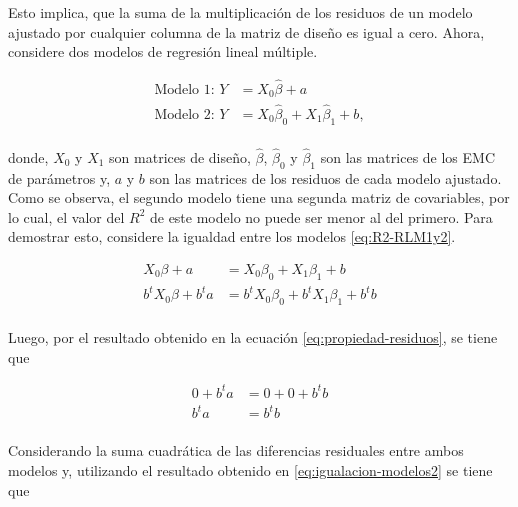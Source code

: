 \documentclass[
  11pt,
]{book}
\theoremstyle{definition}
\theoremstyle{definition}
\theoremstyle{definition}
\theoremstyle{definition}
\theoremstyle{remark}
\begin{document}
Esto implica, que la suma de la multiplicación de los residuos de un modelo ajustado por cualquier columna de la matriz de diseño es igual a cero. Ahora, considere dos modelos de regresión lineal múltiple.

\begin{equation}
\begin{split}
\text{Modelo 1: } Y &= X_0\widehat{\beta} + a\\
\text{Modelo 2: } Y &= X_0\widehat{\beta}_0 + X_1\widehat{\beta}_1 + b,\\
\end{split}
\label{eq:R2-RLM1y2}
\end{equation}

donde, \(X_0\) y \(X_1\) son matrices de diseño, \(\widehat{\beta}\), \(\widehat{\beta}_0\) y \(\widehat{\beta}_1\) son las matrices de los EMC de parámetros y, \(a\) y \(b\) son las matrices de los residuos de cada modelo ajustado. Como se observa, el segundo modelo tiene una segunda matriz de covariables, por lo cual, el valor del \(R^2\) de este modelo no puede ser menor al del primero. Para demostrar esto, considere la igualdad entre los modelos \eqref{eq:R2-RLM1y2}.

\begin{equation}
\begin{split}
X_0\beta + a &= X_0\beta_0 + X_1\beta_1 + b\\
b^tX_0\beta + b^ta &= b^tX_0\beta_0 + b^tX_1\beta_1 + b^tb\\
\end{split}
\label{eq:igualacion-modelos1}
\end{equation}

Luego, por el resultado obtenido en la ecuación \eqref{eq:propiedad-residuos}, se tiene que

\begin{equation}
\begin{split}
0 + b^ta &= 0 + 0 + b^tb\\
b^ta &=b^tb\\
\end{split}
\label{eq:igualacion-modelos2}
\end{equation}

Considerando la suma cuadrática de las diferencias residuales entre ambos modelos y, utilizando el resultado obtenido en \eqref{eq:igualacion-modelos2} se tiene que
\end{document}
